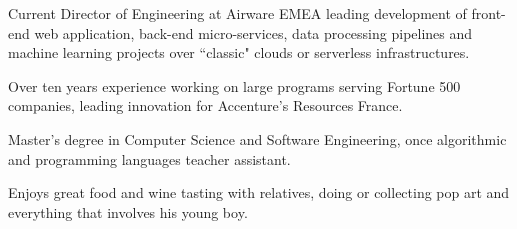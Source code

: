 
\begin{cvparagraph}

Current Director of Engineering at Airware EMEA leading development of front-end web application, back-end micro-services, data processing pipelines and machine learning projects over ``classic" clouds or serverless infrastructures.

Over ten years experience working on large programs serving Fortune 500 companies, leading innovation for Accenture’s Resources France.

Master’s degree in Computer Science and Software Engineering, once algorithmic and programming languages teacher assistant.

Enjoys great food and wine tasting with relatives, doing or collecting pop art and everything that involves his young boy.

\end{cvparagraph}

